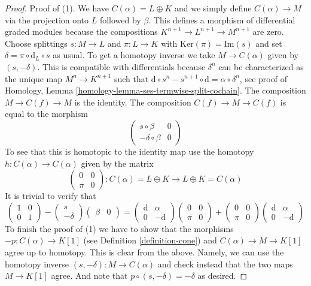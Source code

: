 \begin{proof}
Proof of (1). We have $C(\alpha) = L \oplus K$ and we simply define
$C(\alpha) \to M$ via the projection onto $L$ followed by $\beta$.
This defines a morphism of differential graded modules because the
compositions $K^{n + 1} \to L^{n + 1} \to M^{n + 1}$ are zero.
Choose splittings $s : M \to L$ and $\pi : L \to K$ with
$\text{Ker}(\pi) = \text{Im}(s)$ and set
$\delta = \pi \circ \text{d}_L \circ s$ as usual.
To get a homotopy inverse we take
$M \to C(\alpha)$ given by $(s , -\delta)$. This is compatible with
differentials because $\delta^n$ can be characterized as the
unique map $M^n \to K^{n + 1}$ such that
$\text{d} \circ s^n - s^{n + 1} \circ \text{d} = \alpha \circ \delta^n$,
see proof of
Homology, Lemma \ref{homology-lemma-ses-termwise-split-cochain}.
The composition $M \to C(f) \to M$ is the identity.
The composition $C(f) \to M \to C(f)$ is equal to the morphism
$$
\left(
\begin{matrix}
s \circ \beta & 0 \\
-\delta \circ \beta & 0
\end{matrix}
\right)
$$
To see that this is homotopic to the identity map
use the homotopy $h : C(\alpha) \to C(\alpha)$
given by the matrix
$$
\left(
\begin{matrix}
0 & 0 \\
\pi & 0
\end{matrix}
\right) :
C(\alpha) = L \oplus K
\to
L \oplus K = C(\alpha)
$$
It is trivial to verify that
$$
\left(
\begin{matrix}
1 & 0 \\
0 & 1
\end{matrix}
\right)
-
\left(
\begin{matrix}
s \\
-\delta
\end{matrix}
\right)
\left(
\begin{matrix}
\beta & 0
\end{matrix}
\right)
=
\left(
\begin{matrix}
\text{d} & \alpha \\
0 & -\text{d}
\end{matrix}
\right)
\left(
\begin{matrix}
0 & 0 \\
\pi & 0
\end{matrix}
\right)
+
\left(
\begin{matrix}
0 & 0 \\
\pi & 0
\end{matrix}
\right)
\left(
\begin{matrix}
\text{d} & \alpha \\
0 & -\text{d}
\end{matrix}
\right)
$$
To finish the proof of (1) we have to show that the morphisms
$-p : C(\alpha) \to K[1]$ (see
Definition \ref{definition-cone})
and $C(\alpha) \to M \to K[1]$ agree up
to homotopy. This is clear from the above. Namely, we can use the homotopy
inverse $(s, -\delta) : M \to C(\alpha)$
and check instead that the two maps
$M \to K[1]$ agree. And note that
$p \circ (s, -\delta) = -\delta$ as desired.


\end{proof}
